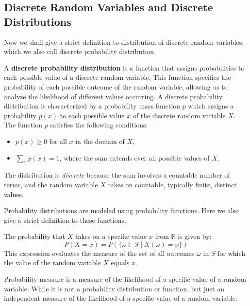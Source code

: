 \subsection{Discrete Random Variables and Discrete Distributions}
Now we shall give a strict definition to distribution of discrete random variables, which we 
also call discrete probability distribution.
\begin{definition}
    A \textbf{discrete probability distribution} is a function that assigns 
    probabilities to each possible value of a discrete random variable. 
    This function specifies the probability of each possible outcome of the 
    random variable, allowing us to analyze the likelihood of different values 
    occurring.
    A discrete probability distribution is characterized by a probability mass function \( p \) which assigns a probability \( p(x) \) to each possible value \( x \) of the discrete random variable \( X \). The function \( p \) satisfies the following conditions:
\begin{itemize}
    \item \( p(x) \geq 0 \) for all \( x \) in the domain of \( X \),
    \item \( \sum_{x} p(x) = 1 \), where the sum extends over all possible values of \( X \).
\end{itemize}

The distribution is \textit{discrete} because the sum involves a countable number of terms, and the random variable \( X \) takes on countable, typically finite, distinct values.
\end{definition}

Probability distributions are modeled using probability functions. Here we also give 
a strict definition to these functions.

\begin{definition}
    The probability that \( X \) takes on a specific value \( x \) from \( \mathbb{R} \) is given by:
    \[ P(X = x) = P(\{\omega \in S \mid X(\omega) = x\}) \]
    This expression evaluates the measure of the set of all outcomes \( \omega \) in \( S \) for which the value of the random variable \( X \) equals \( x \).

\end{definition}
Probability measure is a measure of the likelihood of a specific value of a random variable.
While it is not a probability distribution or function, but just an independent measure 
of the likelihood of a specific value of a random variable.

